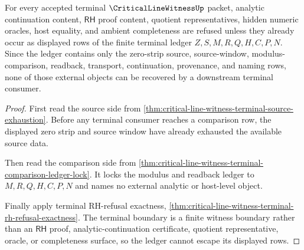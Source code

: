 \begin{theorem}
\label{thm:critical-line-witness-terminal-ledger-nonescape}
For every accepted terminal $\CriticalLineWitnessUp$ packet, analytic
continuation content, $\mathsf{RH}$ proof content, quotient representatives,
hidden numeric oracles, host equality, and ambient completeness are refused
unless they already occur as displayed rows of the finite terminal ledger
$Z,S,M,R,Q,H,C,P,N$. Since the ledger contains only the zero-strip source,
source-window, modulus-comparison, readback, transport, continuation,
provenance, and naming rows, none of those external objects can be recovered by
a downstream terminal consumer.
\end{theorem}
\begin{proof}
First read the source side from
\autoref{thm:critical-line-witness-terminal-source-exhaustion}. Before any
terminal consumer reaches a comparison row, the displayed zero strip and source
window have already exhausted the available source data.

Then read the comparison side from
\autoref{thm:critical-line-witness-terminal-comparison-ledger-lock}. It locks
the modulus and readback ledger to $M,R,Q,H,C,P,N$ and names no external
analytic or host-level object.

Finally apply terminal RH-refusal exactness,
\autoref{thm:critical-line-witness-terminal-rh-refusal-exactness}. The terminal
boundary is a finite witness boundary rather than an $\mathsf{RH}$ proof,
analytic-continuation certificate, quotient representative, oracle, or
completeness surface, so the ledger cannot escape its displayed rows.
\end{proof}

